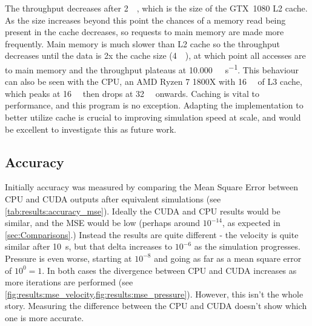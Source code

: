 The throughput decreases after \SI{2}{\mega\byte}, which is the size of the GTX~1080 L2 cache\cite{nvidia1080Whitepaper}.
As the size increases beyond this point the chances of a memory read being present in the cache decreases, so requests to main memory are made more frequently.
Main memory is much slower than L2 cache so the throughput decreases until the data is 2x the cache size (\SI{4}{\mega\byte}), at which point all accesses are to main memory and the throughput plateaus at \SI{10,000}{\mega\op\per\second}.
This behaviour can also be seen with the CPU, an AMD Ryzen 7 1800X with \SI{16}{\mega\byte} of L3 cache, which peaks at \SI{16}{\mega\byte} then drops at \SI{32}{\mega\byte} onwards.
Caching is vital to performance, and this program is no exception.
Adapting the implementation to better utilize cache is crucial to improving simulation speed at scale, and would be excellent to investigate this as future work.

\subsection{Accuracy}\label{sec:Results:Sim:Accuracy}



Initially accuracy was measured by comparing the Mean Square Error between CPU and CUDA outputs after equivalent simulations (see \cref{tab:results:accuracy_mse}).
Ideally the CUDA and CPU results would be similar, and the MSE would be low (perhaps around $10^{-14}$, as expected in \cref{sec:Comparisons}.)
Instead the results are quite different - the velocity is quite similar after \SI{10}{\second}, but that delta increases to $10^{-6}$ as the simulation progresses.
Pressure is even worse, starting at $10^{-8}$ and going as far as a mean square error of $10^{0} = 1$.
In both cases the divergence between CPU and CUDA increases as more iterations are performed (see \cref{fig:results:mse_velocity,fig:results:mse_pressure}).
However, this isn't the whole story.
Measuring the difference between the CPU and CUDA doesn't show which one is more accurate.

